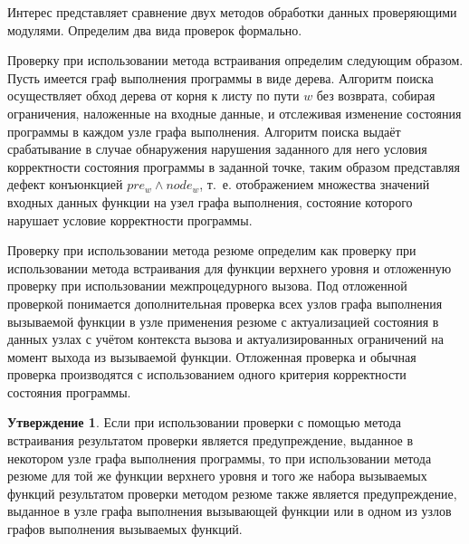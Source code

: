 Интерес представляет сравнение двух методов обработки данных проверяющими модулями. Определим два вида проверок формально.

Проверку при использовании метода встраивания определим следующим образом. Пусть имеется граф выполнения программы в виде дерева. Алгоритм поиска осуществляет обход дерева от корня к листу по пути $w$ без возврата, собирая ограничения, наложенные на входные данные, и отслеживая изменение состояния программы в каждом узле графа выполнения. Алгоритм поиска выдаёт срабатывание в случае обнаружения нарушения заданного для него условия корректности состояния программы в заданной точке, таким образом представляя дефект конъюнкцией $pre_w \wedge node_w$, т.~е. отображением множества значений входных данных функции на узел графа выполнения, состояние которого нарушает условие корректности программы.

Проверку при использовании метода резюме определим как проверку при использовании метода встраивания для функции верхнего уровня и отложенную проверку при использовании межпроцедурного вызова. Под отложенной проверкой понимается дополнительная проверка всех узлов графа выполнения вызываемой функции в узле применения резюме с актуализацией состояния в данных узлах с учётом контекста вызова и актуализированных ограничений на момент выхода из вызываемой функции. Отложенная проверка и обычная проверка производятся с использованием одного критерия корректности состояния программы.

\textbf{Утверждение 1}. Если при использовании проверки с помощью метода встраивания результатом проверки является предупреждение, выданное в некотором узле графа выполнения программы, то при использовании метода резюме для той же функции верхнего уровня и того же набора вызываемых функций результатом проверки методом резюме также является предупреждение, выданное в узле графа выполнения вызывающей функции или в одном из узлов графов выполнения вызываемых функций.

